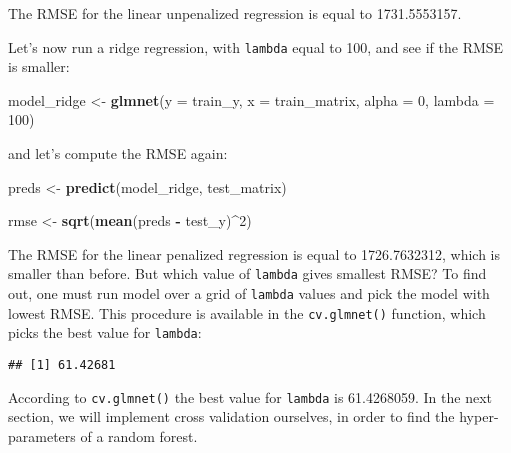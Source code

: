 \documentclass[
]{article}
\newenvironment{Shaded}{\begin{snugshade}}{\end{snugshade}}
\newcommand{\CommentTok}[1]{\textcolor[rgb]{0.56,0.35,0.01}{\textit{#1}}}
\newcommand{\DataTypeTok}[1]{\textcolor[rgb]{0.13,0.29,0.53}{#1}}
\newcommand{\DecValTok}[1]{\textcolor[rgb]{0.00,0.00,0.81}{#1}}
\newcommand{\KeywordTok}[1]{\textcolor[rgb]{0.13,0.29,0.53}{\textbf{#1}}}
\newcommand{\NormalTok}[1]{#1}
\newcommand{\OperatorTok}[1]{\textcolor[rgb]{0.81,0.36,0.00}{\textbf{#1}}}
\newcommand{\StringTok}[1]{\textcolor[rgb]{0.31,0.60,0.02}{#1}}
\begin{document}
The RMSE for the linear unpenalized regression is equal to 1731.5553157.

Let's now run a ridge regression, with \texttt{lambda} equal to 100, and see if the RMSE is smaller:

\begin{Shaded}
\begin{Highlighting}[]
\NormalTok{model\_ridge \textless{}{-}}\StringTok{ }\KeywordTok{glmnet}\NormalTok{(}\DataTypeTok{y =}\NormalTok{ train\_y, }\DataTypeTok{x =}\NormalTok{ train\_matrix, }\DataTypeTok{alpha =} \DecValTok{0}\NormalTok{, }\DataTypeTok{lambda =} \DecValTok{100}\NormalTok{)}
\end{Highlighting}
\end{Shaded}

and let's compute the RMSE again:

\begin{Shaded}
\begin{Highlighting}[]
\NormalTok{preds \textless{}{-}}\StringTok{ }\KeywordTok{predict}\NormalTok{(model\_ridge, test\_matrix)}

\NormalTok{rmse \textless{}{-}}\StringTok{ }\KeywordTok{sqrt}\NormalTok{(}\KeywordTok{mean}\NormalTok{(preds }\OperatorTok{{-}}\StringTok{ }\NormalTok{test\_y)}\OperatorTok{\^{}}\DecValTok{2}\NormalTok{)}
\end{Highlighting}
\end{Shaded}

The RMSE for the linear penalized regression is equal to 1726.7632312, which is smaller than before.
But which value of \texttt{lambda} gives smallest RMSE? To find out, one must run model over a grid of
\texttt{lambda} values and pick the model with lowest RMSE. This procedure is available in the \texttt{cv.glmnet()}
function, which picks the best value for \texttt{lambda}:

\begin{Shaded}
\end{Shaded}

\begin{verbatim}
## [1] 61.42681
\end{verbatim}

According to \texttt{cv.glmnet()} the best value for \texttt{lambda} is 61.4268059. In the
next section, we will implement cross validation ourselves, in order to find the hyper-parameters
of a random forest.
\end{document}
